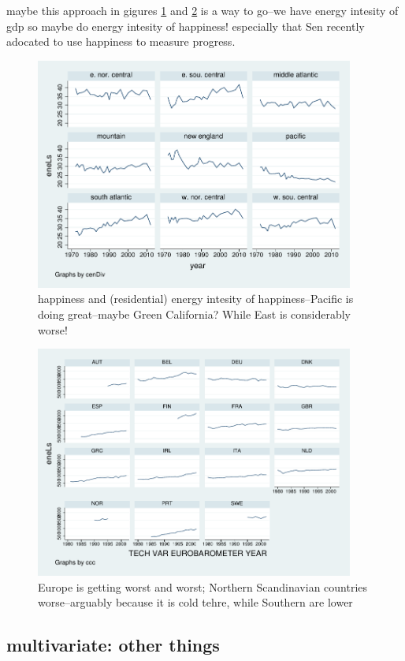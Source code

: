 \documentclass[10pt, letterpaper]{article}
\begin{document}
\begin{spacing}{1.4}
maybe this approach in gigures \ref{cenDiveneLs} and \ref{ebTSeneLs} is a way to
go--we have energy intesity of gdp so maybe do energy intesity of happiness!
especially that Sen recently adocated to use happiness to measure progress.

\begin{figure}[H]
 \includegraphics[height=3in]{graphsAndTables/cenDiveneLs.pdf}\centering
\caption{happiness and (residential) energy intesity of happiness--Pacific is
  doing great--maybe Green California? While East is considerably worse! }\label{cenDiveneLs}
\end{figure}

\begin{figure}[H]
 \includegraphics[height=3in]{graphsAndTables/ebTSeneLs.pdf}\centering
\caption{Europe is getting worst and worst; Northern Scandinavian countries
  worse--arguably because it is cold tehre, while Southern are lower}\label{ebTSeneLs}
\end{figure}

\subsection{multivariate: other things}
\label{mvarOthThings}


\end{spacing}
\end{document}
